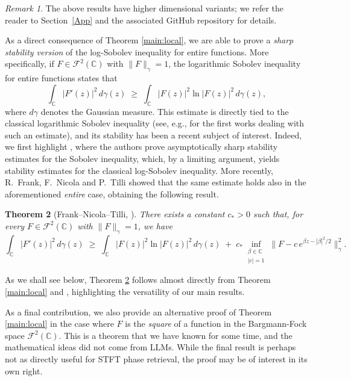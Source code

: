 \documentclass[11pt]{amsart}
\newtheorem{theorem}{Theorem}[section]
\theoremstyle{remark}
\newtheorem{remark}[theorem]{Remark}
\newcommand{\C}{\mathbb{C}}
\begin{document}
\begin{remark}
    The above results have higher dimensional variants; we refer the reader to Section~\ref{App} and the associated GitHub repository for details. 
\end{remark}

As a direct consequence of Theorem \ref{main:local}, we are able to prove a \emph{sharp stability version} of the log-Sobolev inequality for entire functions. More specifically, if $F \in \mathcal{F}^2(\mathbb{C})$ with $\|F\|_{\gamma}= 1$, the logarithmic Sobolev inequality for entire functions states that 
\[
 \int_{\mathbb{C}} |F'(z)|^2 \, d\gamma(z)
  \;\ge\;
  \int_{\mathbb{C}} |F(z)|^2 \ln |F(z)|^2 \, d\gamma(z),
\]
where $d\gamma$ denotes the Gaussian measure. This estimate is directly tied to the classical logarithmic Sobolev inequality (see, e.g., \cite{Gross1975,Stam1959,Weissler1978} for the first works dealing with such an estimate), and its stability has been a recent subject of interest. Indeed, we first highlight \cite{DolbeaultEstebanFigalliFrankLoss2025}, where the authors prove asymptotically sharp stability estimates for the Sobolev inequality, which, by a limiting argument, yields stability estimates for the classical log-Sobolev inequality. More recently, R.~Frank, F.~Nicola and P.~Tilli \cite{FrankNicolaTilli2025} showed that the same estimate holds also in the aforementioned \emph{entire} case, obtaining the following result. 
\begin{theorem}[Frank--Nicola--Tilli, {\cite[Theorem~14]{FrankNicolaTilli2025}}]\label{thm:FNTLogSob}
There exists a constant $c_\ast > 0$ such that, for every
$F \in \mathcal{F}^2(\mathbb{C})$ with $\|F\|_{\gamma} = 1$, we have
\begin{equation*}
  \int_{\mathbb{C}} |F'(z)|^2 \, d\gamma(z)
  \;\ge\;
  \int_{\mathbb{C}} |F(z)|^2 \ln |F(z)|^2 \, d\gamma(z)
  \;+\;
  c_\ast \!\!\inf_{\substack{\beta \in \mathbb{C} \\ |c|=1}}\!
  \bigl\| F - c\, e^{\beta z - |\beta|^2/2} \bigr\|_{\gamma}^{2}.
\end{equation*}

\end{theorem}

As we shall see below, Theorem \ref{thm:FNTLogSob} follows almost directly from Theorem \ref{main:local} and \cite[Corollary~1.2]{DolbeaultEstebanFigalliFrankLoss2025}, highlighting the versatility of our main results. 
\medskip

As a final contribution, we also provide an alternative proof of Theorem \ref{main:local} in the case where $F$ is the \emph{square} of a function in the Bargmann-Fock space $\mathcal{F}^2(\C).$ This is a theorem that we have known for some time, and the mathematical ideas did not come from LLMs. While the final result is perhaps not as directly useful for STFT phase retrieval, the proof may be of interest in its own right.%
\end{document}
